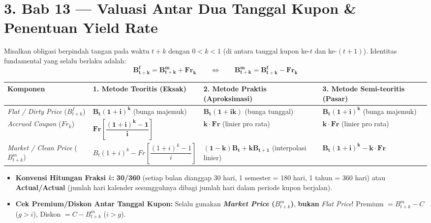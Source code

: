 \documentclass[10pt,a4paper]{article}
\begin{document}
\section*{\large 3. Bab 13 --- Valuasi Antar Dua Tanggal Kupon \& Penentuan Yield Rate}

\begin{rumusbox}
Misalkan obligasi berpindah tangan pada waktu $t + k$ dengan $0 < k < 1$ (di antara tanggal kupon ke-$t$ dan ke-$(t+1)$). Identitas fundamental yang selalu berlaku adalah:
\[
    \mathbf{B_{t+k}^f = B_{t+k}^m + Fr_k} \qquad\iff\qquad \mathbf{B_{t+k}^m = B_{t+k}^f - Fr_k}
\]
\begin{center}
\small
\renewcommand{\arraystretch}{1.35}
\begin{tabular}{@{}p{2.9cm}p{4.3cm}p{4.4cm}p{4.5cm}@{}}
\toprule
\textbf{Komponen} & \textbf{1. Metode Teoritis (Eksak)} & \textbf{2. Metode Praktis (Aproksimasi)} & \textbf{3. Metode Semi-teoritis (Pasar)} \\
\midrule
\textit{Flat / Dirty Price} ($B_{t+k}^f$) & $\mathbf{B_t (1 + i)^k}$ (bunga majemuk) & $\mathbf{B_t (1 + ik)}$ (bunga tunggal) & $\mathbf{B_t (1 + i)^k}$ (bunga majemuk) \\
\textit{Accrued Coupon} ($Fr_k$) & $\mathbf{Fr \left[\dfrac{(1+i)^k - 1}{i}\right]}$ & $\mathbf{k \cdot Fr}$ (linier pro rata) & $\mathbf{k \cdot Fr}$ (linier pro rata) \\
\textit{Market / Clean Price} ($B_{t+k}^m$) & $B_t(1+i)^k - Fr\left[\dfrac{(1+i)^k - 1}{i}\right]$ & $\mathbf{(1-k)B_t + k B_{t+1}}$ (interpolasi linier) & $\mathbf{B_t(1+i)^k - k \cdot Fr}$ \\
\bottomrule
\end{tabular}
\end{center}
\begin{itemize}[leftmargin=1.5em, topsep=1pt, itemsep=1.5pt]
    \item \textbf{Konvensi Hitungan Fraksi $k$:} \textbf{30/360} (setiap bulan dianggap 30 hari, 1 semester = 180 hari, 1 tahun = 360 hari) atau \textbf{Actual/Actual} (jumlah hari kalender sesungguhnya dibagi jumlah hari dalam periode kupon berjalan).
    \item \textbf{Cek Premium/Diskon Antar Tanggal Kupon:} Selalu gunakan \textbf{\textit{Market Price} ($B_{t+k}^m$)}, \textbf{bukan} \textit{Flat Price}! Premium $= B_{t+k}^m - C$ ($g > i$), Diskon $= C - B_{t+k}^m$ ($i > g$).
\end{itemize}
\end{rumusbox}
\end{document}
